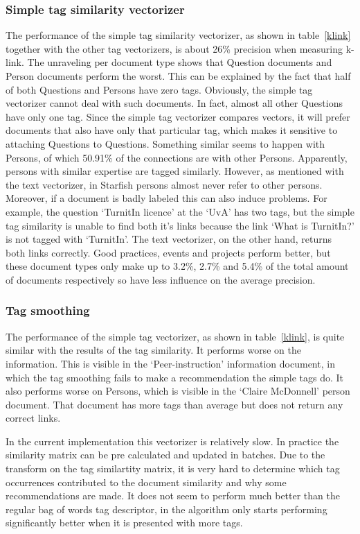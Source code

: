 \subsubsection{Simple tag similarity vectorizer} 
The performance of the simple tag similarity vectorizer, as shown in
table~\ref{klink} together with the other tag vectorizers, is about 26\%
precision when measuring k-link. The unraveling per document type shows that
Question documents and Person documents perform the worst. This can be
explained by the fact that half of both Questions and Persons have zero tags.
Obviously, the simple tag vectorizer cannot deal with such documents. In fact,
almost all other Questions have only one tag. Since the simple tag vectorizer
compares vectors, it will prefer documents that also have only that particular
tag, which makes it sensitive to attaching Questions to Questions. Something
similar seems to happen with Persons, of which 50.91\% of the connections are
with other Persons.  Apparently, persons with similar expertise are tagged
similarly.  However, as mentioned with the text vectorizer, in Starfish persons
almost never refer to other persons.
Moreover, if a document is badly labeled this can also induce problems. For example, the question `TurnitIn licence' at the `UvA' has two tags, but the simple tag similarity is unable to find both it's links because 
the link `What is TurnitIn?' is not tagged with `TurnitIn'. The text vectorizer, on the other hand, returns both
links correctly. Good practices, events and projects perform better, 
but these document types only make up to 3.2\%, 2.7\% and 5.4\% of the
total amount of documents respectively so have less influence on the average
precision.

\subsubsection{Tag smoothing}
The performance of the simple tag vectorizer, as shown in table~\ref{klink}, is
quite similar with the results of the tag similarity. It performs worse on the
information. This is visible in the `Peer-instruction' information document, in which the tag smoothing fails to make a recommendation the simple tags do. It also
performs worse on Persons, which is visible in the `Claire McDonnell' person document. That document has more tags than average but does not return any correct links.

In the current implementation this vectorizer is relatively slow. In practice
the similarity matrix can be pre calculated and updated in batches. Due to the
transform on the tag similartity matrix, it is very hard to determine which tag
occurrences contributed to the document similarity and why some recommendations
are made. It does not seem to perform much better than the regular bag of words
tag descriptor, in \citeauthor{zhou2011web} the algorithm only starts
performing significantly better when it is presented with more tags.


